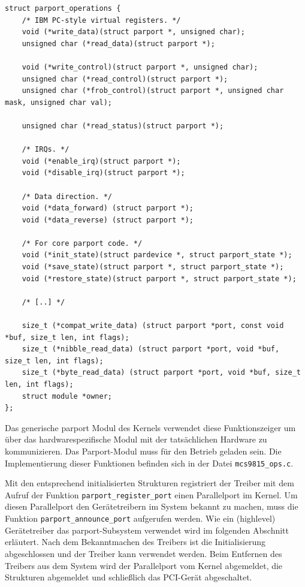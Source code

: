 \documentclass[a4paper,11pt]{article}
\begin{document}
\begin{verbatim}
struct parport_operations {
    /* IBM PC-style virtual registers. */
    void (*write_data)(struct parport *, unsigned char);
    unsigned char (*read_data)(struct parport *);

    void (*write_control)(struct parport *, unsigned char);
    unsigned char (*read_control)(struct parport *);
    unsigned char (*frob_control)(struct parport *, unsigned char mask, unsigned char val);

    unsigned char (*read_status)(struct parport *);

    /* IRQs. */
    void (*enable_irq)(struct parport *);
    void (*disable_irq)(struct parport *);

    /* Data direction. */
    void (*data_forward) (struct parport *);
    void (*data_reverse) (struct parport *);

    /* For core parport code. */
    void (*init_state)(struct pardevice *, struct parport_state *);
    void (*save_state)(struct parport *, struct parport_state *);
    void (*restore_state)(struct parport *, struct parport_state *);

    /* [..] */

    size_t (*compat_write_data) (struct parport *port, const void *buf, size_t len, int flags);
    size_t (*nibble_read_data) (struct parport *port, void *buf, size_t len, int flags);
    size_t (*byte_read_data) (struct parport *port, void *buf, size_t len, int flags);
    struct module *owner;
};\end{verbatim}
\noindent
Das generische parport Modul des Kernels verwendet diese Funktionszeiger um über das hardwarespezifische Modul mit 
der tatsächlichen Hardware zu kommunizieren. Das Parport-Modul muss für den Betrieb geladen sein.
Die Implementierung dieser Funktionen befinden sich in der Datei \verb|mcs9815_ops.c|. 

Mit den entsprechend initialisierten Strukturen registriert der Treiber mit dem Aufruf der Funktion \verb|parport_register_port| einen Parallelport im Kernel.
Um diesen Parallelport den Gerätetreibern im System bekannt zu machen, muss die Funktion \verb|parport_announce_port| aufgerufen werden.
Wie ein (highlevel) Gerätetreiber das parport-Subsystem verwendet wird im folgenden Abschnitt erläutert.
Nach dem Bekanntmachen des Treibers ist die Initialisierung abgeschlossen und der Treiber kann verwendet werden.
Beim Entfernen des Treibers aus dem System wird der Parallelport vom Kernel abgemeldet, die Strukturen abgemeldet und schließlich das PCI-Gerät 
abgeschaltet.
\end{document}
